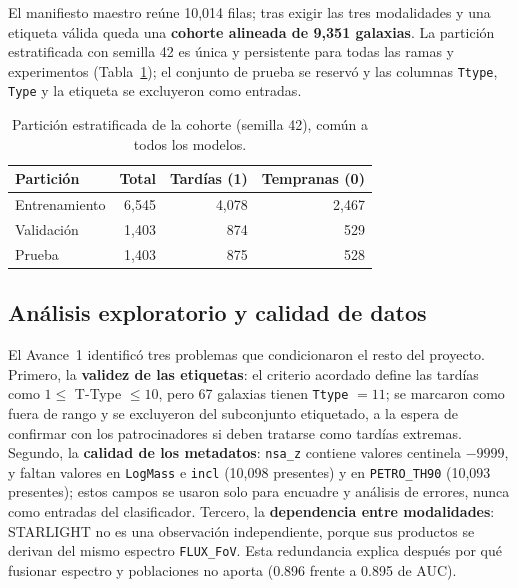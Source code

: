 \documentclass[letterpaper,11pt]{article}
\begin{document}
El manifiesto maestro reúne 10,014 filas; tras exigir las tres modalidades y una etiqueta válida queda una \textbf{cohorte alineada de 9,351 galaxias}. La partición estratificada con semilla 42 es única y persistente para todas las ramas y experimentos (Tabla~\ref{tab:split}); el conjunto de prueba se reservó y las columnas \texttt{Ttype}, \texttt{Type} y la etiqueta se excluyeron como entradas.

\begin{table}[H]
  \centering
  \caption{Partición estratificada de la cohorte (semilla 42), común a todos los modelos.}
  \label{tab:split}
  \begin{tabular}{lrrr}
    \toprule
    Partición & Total & Tardías (1) & Tempranas (0) \\
    \midrule
    Entrenamiento & 6,545 & 4,078 & 2,467 \\
    Validación    & 1,403 &   874 &   529 \\
    Prueba        & 1,403 &   875 &   528 \\
    \bottomrule
  \end{tabular}
\end{table}

\subsection{Análisis exploratorio y calidad de datos}
El Avance~1 identificó tres problemas que condicionaron el resto del proyecto. Primero, la \textbf{validez de las etiquetas}: el criterio acordado define las tardías como $1 \leq$ T-Type $\leq 10$, pero 67 galaxias tienen \texttt{Ttype} $= 11$; se marcaron como fuera de rango y se excluyeron del subconjunto etiquetado, a la espera de confirmar con los patrocinadores si deben tratarse como tardías extremas. Segundo, la \textbf{calidad de los metadatos}: \texttt{nsa\_z} contiene valores centinela $-9999$, y faltan valores en \texttt{LogMass} e \texttt{incl} (10,098 presentes) y en \texttt{PETRO\_TH90} (10,093 presentes); estos campos se usaron solo para encuadre y análisis de errores, nunca como entradas del clasificador. Tercero, la \textbf{dependencia entre modalidades}: STARLIGHT no es una observación independiente, porque sus productos se derivan del mismo espectro \texttt{FLUX\_FoV}. Esta redundancia explica después por qué fusionar espectro y poblaciones no aporta (0.896 frente a 0.895 de AUC).
\end{document}
